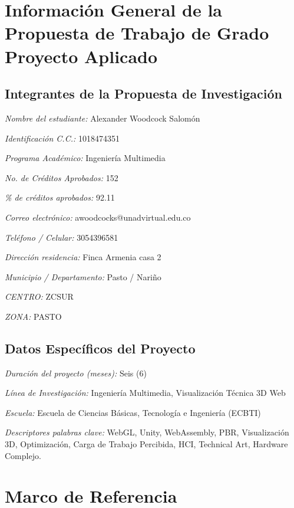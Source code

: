 \documentclass[12pt,letterpaper]{article} %
\begin{document}
\newpage
\section*{Informaci\'on General de la Propuesta de Trabajo de Grado Proyecto Aplicado}
{}

\subsection*{Integrantes de la Propuesta de Investigaci\'on}
{}

\textit{Nombre del estudiante:} Alexander Woodcock Salom\'on

\textit{Identificaci\'on C.C.:} 1018474351

\textit{Programa Acad\'emico:} Ingenier\'ia Multimedia

\textit{No. de Cr\'editos Aprobados:} 152

\textit{\% de cr\'editos aprobados:} 92.11

\textit{Correo electr\'onico:} awoodcocks@unadvirtual.edu.co

\textit{Tel\'efono / Celular:} 3054396581

\textit{Direcci\'on residencia:} Finca Armenia casa 2

\textit{Municipio / Departamento:} Pasto / Nari\~no

\textit{CENTRO:} ZCSUR

\textit{ZONA:} PASTO

\subsection*{Datos Espec\'ificos del Proyecto}
{}

\textit{Duraci\'on del proyecto (meses):} Seis (6)

\textit{L\'inea de Investigaci\'on:} Ingenier\'ia Multimedia, Visualizaci\'on T\'ecnica 3D Web

\textit{Escuela:} Escuela de Ciencias B\'asicas, Tecnolog\'ia e Ingenier\'ia (ECBTI)

\textit{Descriptores palabras clave:} WebGL, Unity, WebAssembly, PBR, Visualizaci\'on 3D, Optimizaci\'on, Carga de Trabajo Percibida, HCI, Technical Art, Hardware Complejo.

\newpage




\section{Marco de Referencia}







\clearpage

\end{document}
